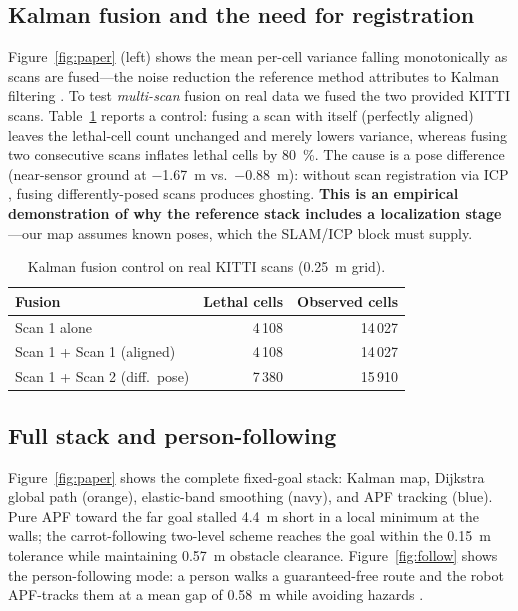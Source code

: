 \documentclass[11pt]{article}
\begin{document}
\subsection{Kalman fusion and the need for registration}
Figure~\ref{fig:paper} (left) shows the mean per-cell variance falling
monotonically as scans are fused---the noise reduction the reference method
attributes to Kalman filtering \cite{refpaper,fankhauser2018}. To test
\emph{multi-scan} fusion on real data we fused the two provided KITTI scans.
Table~\ref{tab:fusion} reports a control: fusing a scan with itself (perfectly
aligned) leaves the lethal-cell count unchanged and merely lowers variance,
whereas fusing two consecutive scans inflates lethal cells by
\SI{80}{\percent}. The cause is a pose difference (near-sensor ground at
\SI{-1.67}{m} vs.\ \SI{-0.88}{m}): without scan registration via ICP
\cite{besl1992}, fusing differently-posed scans produces ghosting. \textbf{This is
an empirical demonstration of why the reference stack includes a localization
stage}---our map assumes known poses, which the SLAM/ICP block must supply.

\begin{table}[t]
\centering
\caption{Kalman fusion control on real KITTI scans (\SI{0.25}{m} grid).}
\label{tab:fusion}
\begin{tabular}{lrr}
\toprule
Fusion & Lethal cells & Observed cells \\
\midrule
Scan 1 alone                 & 4\,108 & 14\,027 \\
Scan 1 + Scan 1 (aligned)    & 4\,108 & 14\,027 \\
Scan 1 + Scan 2 (diff.\ pose)& 7\,380 & 15\,910 \\
\bottomrule
\end{tabular}
\end{table}

\subsection{Full stack and person-following}
Figure~\ref{fig:paper} shows the complete fixed-goal stack: Kalman map, Dijkstra
global path (orange), elastic-band smoothing (navy), and APF tracking (blue).
Pure APF toward the far goal stalled \SI{4.4}{m} short in a local minimum at the
walls; the carrot-following two-level scheme reaches the goal within the
\SI{0.15}{m} tolerance while maintaining \SI{0.57}{m} obstacle clearance.
Figure~\ref{fig:follow} shows the person-following mode: a person walks a
guaranteed-free route and the robot APF-tracks them at a mean gap of \SI{0.58}{m}
while avoiding hazards \cite{islam2019}.
\end{document}
